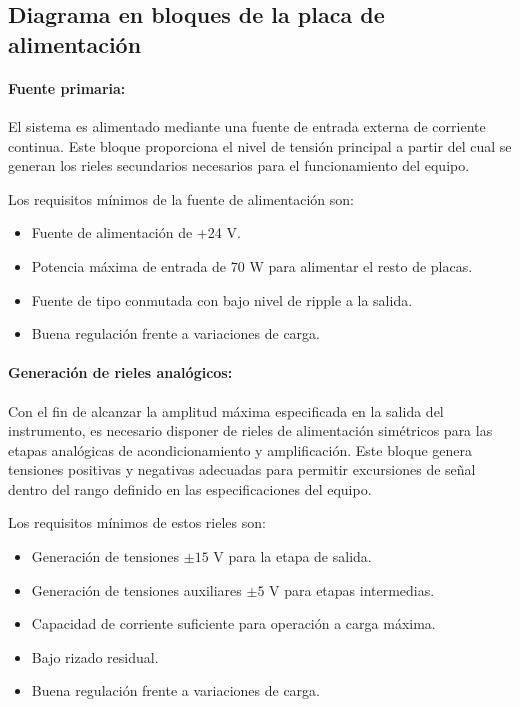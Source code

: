 \subsection{Diagrama en bloques de la placa de alimentación}

\paragraph{Fuente primaria:}
El sistema es alimentado mediante una fuente de entrada externa de corriente continua. Este bloque proporciona el nivel de tensión principal a partir del cual se generan los rieles secundarios necesarios para el funcionamiento del equipo.

Los requisitos mínimos de la fuente de alimentación son:

\begin{itemize}[label=\textbullet]
	\item Fuente de alimentación de +24 V.
	\item Potencia máxima de entrada de 70 W para alimentar el resto de placas.
	\item Fuente de tipo conmutada con bajo nivel de ripple a la salida.
	\item Buena regulación frente a variaciones de carga.
\end{itemize}

\paragraph{Generación de rieles analógicos:}
Con el fin de alcanzar la amplitud máxima especificada en la salida del instrumento, es necesario disponer de rieles de alimentación simétricos para las etapas analógicas de acondicionamiento y amplificación. Este bloque genera tensiones positivas y negativas adecuadas para permitir excursiones de señal dentro del rango definido en las especificaciones del equipo.

Los requisitos mínimos de estos rieles son:

\begin{itemize}[label=\textbullet]
	\item Generación de tensiones $\pm 15$ V para la etapa de salida.
	\item Generación de tensiones auxiliares $\pm 5$ V para etapas intermedias.
	\item Capacidad de corriente suficiente para operación a carga máxima.
	\item Bajo rizado residual.
	\item Buena regulación frente a variaciones de carga.
\end{itemize}

